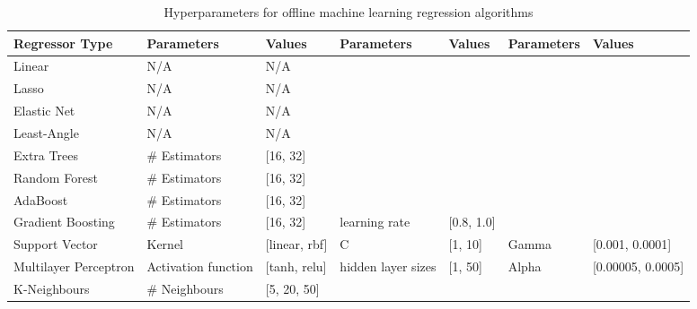 \documentclass[final,3p,times,twocolumn,numbers]{elsarticle}
\begin{document}
\begin{table}
\centering
\begin{tabular}{@{}lllllll@{}}
\toprule
\textbf{Regressor Type} & \textbf{Parameters} & \textbf{Values}   & \textbf{Parameters} & \textbf{Values} & \textbf{Parameters} & \textbf{Values}       \\ \midrule
Linear                  & N/A                 & N/A               &                     &                 &                     &                       \\
Lasso                   & N/A                 & N/A               &                     &                 &                     &                       \\
Elastic Net             & N/A                 & N/A               &                     &                 &                     &                       \\
Least-Angle             & N/A                 & N/A               &                     &                 &                     &                       \\
Extra Trees             & \# Estimators       & {[}16, 32{]}      &                     &                 &                     &                       \\
Random Forest           & \# Estimators       & {[}16, 32{]}      &                     &                 &                     &                       \\
AdaBoost                & \# Estimators       & {[}16, 32{]}      &                     &                 &                     &                       \\
Gradient Boosting       & \# Estimators       & {[}16, 32{]}      & learning rate       & {[}0.8, 1.0{]}  &                     &                       \\
Support Vector          & Kernel              & {[}linear, rbf{]} & C                   & {[}1, 10{]}     & Gamma               & {[}0.001, 0.0001{]}   \\
Multilayer Perceptron   & Activation function & {[}tanh, relu{]}  & hidden layer sizes  & {[}1, 50{]}     & Alpha               & {[}0.00005, 0.0005{]} \\
K-Neighbours            & \# Neighbours       & {[}5, 20, 50{]}   &                     &                 &                     &                       \\ \bottomrule
\end{tabular}%
\caption{Hyperparameters for offline machine learning regression algorithms}
\label{table:hyperparameter-tuning-offline}


\end{table}
\end{document}
